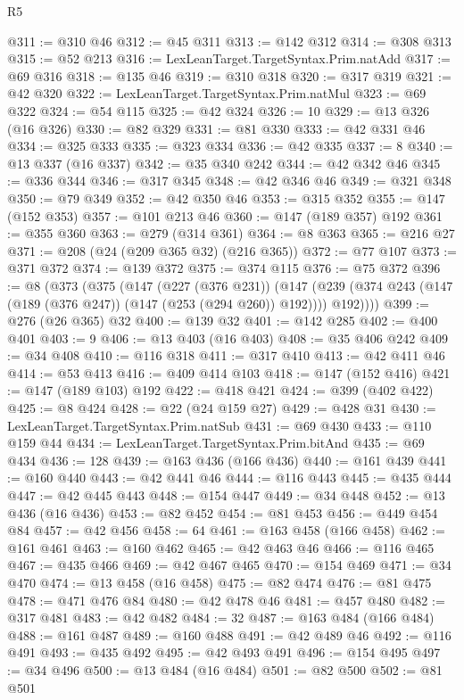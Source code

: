 \begin{lexlean}{R5}
\begin{coremodule}
@311 := @310 @46
@312 := @45 @311
@313 := @142 @312
@314 := @308 @313
@315 := @52 @213
@316 := LexLeanTarget.TargetSyntax.Prim.natAdd
@317 := @69 @316
@318 := @135 @46
@319 := @310 @318
@320 := @317 @319
@321 := @42 @320
@322 := LexLeanTarget.TargetSyntax.Prim.natMul
@323 := @69 @322
@324 := @54 @115
@325 := @42 @324
@326 := 10
@329 := @13 @326 (@16 @326)
@330 := @82 @329
@331 := @81 @330
@333 := @42 @331 @46
@334 := @325 @333
@335 := @323 @334
@336 := @42 @335
@337 := 8
@340 := @13 @337 (@16 @337)
@342 := @35 @340 @242
@344 := @42 @342 @46
@345 := @336 @344
@346 := @317 @345
@348 := @42 @346 @46
@349 := @321 @348
@350 := @79 @349
@352 := @42 @350 @46
@353 := @315 @352
@355 := @147 (@152 @353)
@357 := @101 @213 @46
@360 := @147 (@189 @357) @192
@361 := @355 @360
@363 := @279 (@314 @361)
@364 := @8 @363
@365 := @216 @27
@371 := @208 (@24 (@209 @365 @32) (@216 @365))
@372 := @77 @107
@373 := @371 @372
@374 := @139 @372
@375 := @374 @115
@376 := @75 @372
@396 := @8
    (@373
      (@375
        (@147
          (@227 (@376 @231))
          (@147 (@239 (@374 @243 (@147 (@189 (@376 @247)) (@147 (@253 (@294 @260)) @192)))) @192))))
@399 := @276 (@26 @365) @32
@400 := @139 @32
@401 := @142 @285
@402 := @400 @401
@403 := 9
@406 := @13 @403 (@16 @403)
@408 := @35 @406 @242
@409 := @34 @408
@410 := @116 @318
@411 := @317 @410
@413 := @42 @411 @46
@414 := @53 @413
@416 := @409 @414 @103
@418 := @147 (@152 @416)
@421 := @147 (@189 @103) @192
@422 := @418 @421
@424 := @399 (@402 @422)
@425 := @8 @424
@428 := @22 (@24 @159 @27)
@429 := @428 @31
@430 := LexLeanTarget.TargetSyntax.Prim.natSub
@431 := @69 @430
@433 := @110 @159 @44
@434 := LexLeanTarget.TargetSyntax.Prim.bitAnd
@435 := @69 @434
@436 := 128
@439 := @163 @436 (@166 @436)
@440 := @161 @439
@441 := @160 @440
@443 := @42 @441 @46
@444 := @116 @443
@445 := @435 @444
@447 := @42 @445 @443
@448 := @154 @447
@449 := @34 @448
@452 := @13 @436 (@16 @436)
@453 := @82 @452
@454 := @81 @453
@456 := @449 @454 @84
@457 := @42 @456
@458 := 64
@461 := @163 @458 (@166 @458)
@462 := @161 @461
@463 := @160 @462
@465 := @42 @463 @46
@466 := @116 @465
@467 := @435 @466
@469 := @42 @467 @465
@470 := @154 @469
@471 := @34 @470
@474 := @13 @458 (@16 @458)
@475 := @82 @474
@476 := @81 @475
@478 := @471 @476 @84
@480 := @42 @478 @46
@481 := @457 @480
@482 := @317 @481
@483 := @42 @482
@484 := 32
@487 := @163 @484 (@166 @484)
@488 := @161 @487
@489 := @160 @488
@491 := @42 @489 @46
@492 := @116 @491
@493 := @435 @492
@495 := @42 @493 @491
@496 := @154 @495
@497 := @34 @496
@500 := @13 @484 (@16 @484)
@501 := @82 @500
@502 := @81 @501

\end{coremodule}
\end{lexlean}
